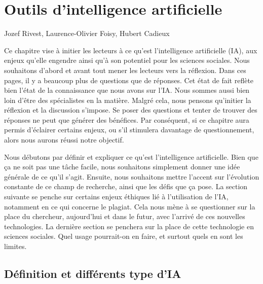 \documentclass[
  letterpaper,
  DIV=11,
  numbers=noendperiod]{scrreprt}
\begin{document}

\chapter{Outils d'intelligence artificielle}\label{sec-chap8}

\begin{center}

Jozef Rivest, Laurence-Olivier Foisy, Hubert Cadieux

\end{center}

Ce chapitre vise à initier les lecteurs à ce qu'est l'intelligence
artificielle (IA), aux enjeux qu'elle engendre ainsi qu'à son potentiel
pour les sciences sociales. Nous souhaitons d'abord et avant tout mener
les lecteurs vers la réflexion. Dans ces pages, il y a beaucoup plus de
questions que de réponses. Cet état de fait reflète bien l'état de la
connaissance que nous avons sur l'IA. Nous sommes aussi bien loin d'être
des spécialistes en la matière. Malgré cela, nous pensons qu'initier la
réflexion et la discussion s'impose. Se poser des questions et tenter de
trouver des réponses ne peut que générer des bénéfices. Par conséquent,
si ce chapitre aura permis d'éclairer certains enjeux, ou s'il stimulera
davantage de questionnement, alors nous aurons réussi notre objectif.

Nous débutons par définir et expliquer ce qu'est l'intelligence
artificielle. Bien que ça ne soit pas une tâche facile, nous souhaitons
simplement donner une idée générale de ce qu'il s'agit. Ensuite, nous
souhaitons mettre l'accent sur l'évolution constante de ce champ de
recherche, ainsi que les défis que ça pose. La section suivante se
penche sur certains enjeux éthiques lié à l'utilisation de l'IA,
notamment en ce qui concerne le plagiat. Cela nous mène à se questionner
sur la place du chercheur, aujourd'hui et dans le futur, avec l'arrivé
de ces nouvelles technologies. La dernière section se penchera sur la
place de cette technologie en sciences sociales. Quel usage pourrait-on
en faire, et surtout quels en sont les limites.

\section{Définition et différents type
d'IA}\label{duxe9finition-et-diffuxe9rents-type-dia}
\end{document}
